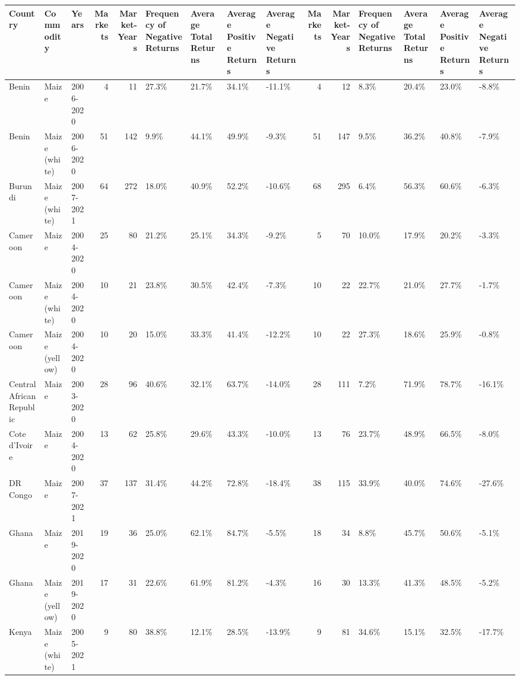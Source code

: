 \begin{table}[ht]
\centering
\begin{tabular}{lllrrllllrrllll}
  \hline
Country & Commodity & Years & Markets & Market-Years & Frequency of Negative Returns & Average Total Returns & Average Positive Returns & Average Negative Returns & Markets & Market-Years & Frequency of Negative Returns & Average Total Returns & Average Positive Returns & Average Negative Returns \\ 
  \hline
Benin & Maize & 2006-2020 &   4 &  11 & 27.3\% & 21.7\% & 34.1\% & -11.1\% &   4 &  12 & 8.3\% & 20.4\% & 23.0\% & -8.8\% \\ 
  Benin & Maize (white) & 2006-2020 &  51 & 142 & 9.9\% & 44.1\% & 49.9\% & -9.3\% &  51 & 147 & 9.5\% & 36.2\% & 40.8\% & -7.9\% \\ 
  Burundi & Maize (white) & 2007-2021 &  64 & 272 & 18.0\% & 40.9\% & 52.2\% & -10.6\% &  68 & 295 & 6.4\% & 56.3\% & 60.6\% & -6.3\% \\ 
  Cameroon & Maize & 2004-2020 &  25 &  80 & 21.2\% & 25.1\% & 34.3\% & -9.2\% &   5 &  70 & 10.0\% & 17.9\% & 20.2\% & -3.3\% \\ 
  Cameroon & Maize (white) & 2004-2020 &  10 &  21 & 23.8\% & 30.5\% & 42.4\% & -7.3\% &  10 &  22 & 22.7\% & 21.0\% & 27.7\% & -1.7\% \\ 
  Cameroon & Maize (yellow) & 2004-2020 &  10 &  20 & 15.0\% & 33.3\% & 41.4\% & -12.2\% &  10 &  22 & 27.3\% & 18.6\% & 25.9\% & -0.8\% \\ 
  Central African Republic & Maize & 2003-2020 &  28 &  96 & 40.6\% & 32.1\% & 63.7\% & -14.0\% &  28 & 111 & 7.2\% & 71.9\% & 78.7\% & -16.1\% \\ 
  Cote d'Ivoire & Maize & 2004-2020 &  13 &  62 & 25.8\% & 29.6\% & 43.3\% & -10.0\% &  13 &  76 & 23.7\% & 48.9\% & 66.5\% & -8.0\% \\ 
  DR Congo & Maize & 2007-2021 &  37 & 137 & 31.4\% & 44.2\% & 72.8\% & -18.4\% &  38 & 115 & 33.9\% & 40.0\% & 74.6\% & -27.6\% \\ 
  Ghana & Maize & 2019-2020 &  19 &  36 & 25.0\% & 62.1\% & 84.7\% & -5.5\% &  18 &  34 & 8.8\% & 45.7\% & 50.6\% & -5.1\% \\ 
  Ghana & Maize (yellow) & 2019-2020 &  17 &  31 & 22.6\% & 61.9\% & 81.2\% & -4.3\% &  16 &  30 & 13.3\% & 41.3\% & 48.5\% & -5.2\% \\ 
  Kenya & Maize (white) & 2005-2021 &   9 &  80 & 38.8\% & 12.1\% & 28.5\% & -13.9\% &   9 &  81 & 34.6\% & 15.1\% & 32.5\% & -17.7\% \\ 

\end{tabular}
\end{table}
